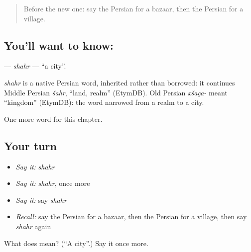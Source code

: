 \label{lesson:FA-C72-shahr}



\begin{quote}
Before the new one: say the Persian for a bazaar, then the Persian for a village.
\end{quote}

\subsection*{You'll want to know: }
\textbf{} — \emph{shahr} — \textquotedblleft{}a city\textquotedblright{}.

\begin{cousinweb}
\emph{shahr} is a native Persian word, inherited rather than borrowed: it continues Middle Persian \emph{šahr}, \textquotedblleft{}land, realm\textquotedblright{} (EtymDB). Old Persian \emph{xšaça-} meant \textquotedblleft{}kingdom\textquotedblright{} (EtymDB): the word narrowed from a realm to a city.
\end{cousinweb}

\begin{grammarlens}[title={What you've built}]
One more word for this chapter.
\end{grammarlens}

\subsection*{Your turn}
\begin{itemize}
\raggedright
  \item \emph{Say it:} \emph{shahr}
  \item \emph{Say it:} \emph{shahr}, once more
  \item \emph{Say it:} say \emph{shahr}
  \item \emph{Recall:} say the Persian for a bazaar, then the Persian for a village, then say \emph{shahr} again
\end{itemize}

\begin{tcolorbox}[breakable,colback=teal!4,colframe=teal!35!black,title={Before you move on}]
What does  mean? (\textquotedblleft{}A city\textquotedblright{}.) Say it once more.
\end{tcolorbox}
